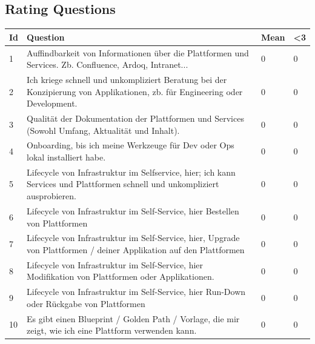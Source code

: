 \documentclass[a4paper,12pt]{article}
\begin{document}
    \subsection{Rating Questions}
    \label{subsubsec:rating}
    \begin{table}[!htbp]
        \begin{center}
            \begin{tabularx}{\textwidth}{lXll}
                \toprule
                Id & Question                                                                                                                                                                              & Mean & <3 \\
                \midrule
                1  & Auffindbarkeit von Informationen über die Plattformen und Services. Zb. Confluence, Ardoq, Intranet... & 0 & 0         \\
                2  & Ich kriege schnell und unkompliziert Beratung bei der Konzipierung von Applikationen, zb. für Engineering oder Development. & 0 & 0  \\
                3  & Qualität der Dokumentation der Plattformen und Services (Sowohl Umfang, Aktualität und Inhalt). & 0 & 0  \\
                4  & Onboarding, bis ich meine Werkzeuge für Dev oder Ops lokal installiert habe.                                                                                                          & 0 & 0  \\
                5  & Lifecycle von Infrastruktur im Selfservice, hier; ich kann Services und Plattformen schnell und unkompliziert ausprobieren.  & 0 & 0  \\
                6  & Lifecycle von Infrastruktur im Self-Service, hier Bestellen von Plattformen                                                                                                           & 0    & 0  \\
                7  & Lifecycle von Infrastruktur im Self-Service, hier, Upgrade von Plattformen / deiner Applikation auf den Plattformen & 0 & 0  \\
                8  & Lifecycle von Infrastruktur im Self-Service, hier Modifikation von Plattformen oder Applikationen. & 0 & 0  \\
                9  & Lifecycle von Infrastruktur im Self-Service, hier Run-Down oder Rückgabe von Plattformen & 0 & 0  \\
                10 & Es gibt einen Blueprint / Golden Path / Vorlage, die mir zeigt, wie ich eine Plattform verwenden kann. & 0 & 0  \\

\end{tabularx}
\end{center}
\end{table}
\end{document}
